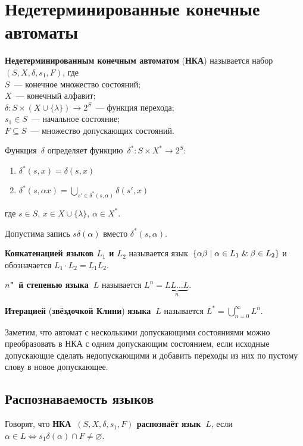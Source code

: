 \section{Недетерминированные конечные автоматы}
  \textbf{Недетерминированным конечным автоматом} (\textbf{НКА}) называется набор~$(S, X, \delta, s_1, F)$, где\\
$S$~--- конечное множество состояний;\\
$X$~--- конечный алфавит;\\
$\delta \colon S \times (X \cup \{ \lambda \}) \to 2^S$~--- функция перехода;\\
$s_1 \in S$~--- начальное состояние;\\
$F \subseteq S$~--- множество допускающих состояний.

Функция~$\delta$ определяет функцию~$\delta^* \colon S \times X^* \to 2^S$:
\begin{enumerate}
	\item $\delta^*(s, x) = \delta(s, x)$
	\item $\delta^*(s, \alpha x) = \bigcup\limits_{s' \in \delta^*(s, \alpha)} \delta(s', x)$
\end{enumerate}
где $s \in S$, $x \in X \cup \{ \lambda \}$, $\alpha \in X^*$.

Допустима запись $s \delta(\alpha)$ вместо $\delta^*(s, \alpha)$.

 \textbf{Конкатенацией языков $L_1$ и $L_2$} называется язык~$\{ \alpha \beta \mid \alpha \in L_1 \mathrel{\&} \beta \in L_2 \}$ и обозначается $L_1 \cdot L_2 = L_1 L_2$.

 \textbf{$n$"~й степенью языка~$L$} называется $L^n = \underbrace{L L \ldots L}_n$.

  \textbf{Итерацией} (\textbf{звёздочкой Клини}) \textbf{языка~$L$} называется $L^* = \bigcup\limits_{n=0}^\infty L^n$.

Заметим, что автомат с несколькими допускающими состояниями можно преобразовать в НКА с одним допускающим состоянием, если исходные допускающие сделать недопускающими и добавить переходы из них по пустому слову в новое допускающее.

\subsection{Распознаваемость языков}
Говорят, что \textbf{НКА~$(S, X, \delta, s_1, F)$ распознаёт язык~$L$}, если $\alpha \in L \Leftrightarrow s_1 \delta(\alpha) \cap F \neq \varnothing$.


